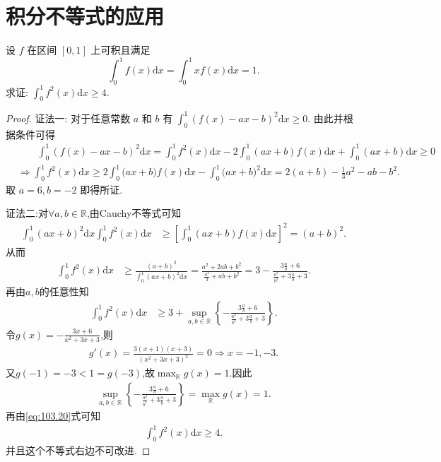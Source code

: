 \documentclass[../../main.tex]{subfiles}
\begin{document}
\section{积分不等式的应用}

\begin{example}
设 $f$ 在区间 $[0,1]$ 上可积且满足
$$\int_0^1 f(x)\mathrm{d}x=\int_0^1 xf(x)\mathrm{d}x=1.$$
求证: $\int_0^1 f^2(x)\mathrm{d}x\geqslant 4$.
\end{example}
\begin{proof}
{\color{blue}证法一:}
对于任意常数 $a$ 和 $b$ 有 $\int_0^1 (f(x)-ax-b)^2\mathrm{d}x\geqslant 0$. 由此并根据条件可得
$$
\begin{aligned}
&\quad \quad \int_0^1{\left( f\left( x \right) -ax-b \right) ^2\mathrm{d}x}=\int_0^1{f^2\left( x \right) \mathrm{d}x}-2\int_0^1{\left( ax+b \right) f\left( x \right) \mathrm{d}x}+\int_0^1{\left( ax+b \right) \mathrm{d}x}\geqslant 0
\\
&\Longrightarrow \int_0^1{f^2\left( x \right) \mathrm{d}x}\geqslant 2\int_0^1{(ax}+b)f\left( x \right) \mathrm{d}x-\int_0^1{(ax}+b)^2\mathrm{d}x=2(a+b)-\frac{1}{3}a^2-ab-b^2.
\end{aligned}
$$
取 $a=6,b=-2$ 即得所证.

{\color{blue}证法二:}对$\forall a,b\in \mathbb{R}$,由Cauchy不等式可知
\begin{align*}
\int_0^1 (ax+b)^2\mathrm{d}x\int_0^1 f^2(x)\mathrm{d}x&\geqslant  \left[ \int_0^1 (ax+b)f(x)\mathrm{d}x \right]^2=(a+b)^2.
\end{align*}
从而
\begin{align*}
\int_0^1 f^2(x)\mathrm{d}x&\geqslant  \frac{(a+b)^2}{\int_0^1 (ax+b)^2\mathrm{d}x}=\frac{a^2+2ab+b^2}{\frac{a^2}{3}+ab+b^2}=3-\frac{3\frac{a}{b}+6}{\frac{a^2}{b^2}+3\frac{a}{b}+3}.
\end{align*}
再由$a,b$的任意性知
\begin{align}
\int_0^1 f^2(x)\mathrm{d}x&\geqslant  3+\sup_{a,b\in \mathbb{R}}\left\{ -\frac{3\frac{a}{b}+6}{\frac{a^2}{b^2}+3\frac{a}{b}+3} \right\}.\label{eq:103.20}
\end{align}
令$g(x)=-\frac{3x+6}{x^2+3x+3}$,则
\begin{align*}
g'(x)=\frac{3(x+1)(x+3)}{(x^2+3x+3)^2}=0\Rightarrow x=-1,-3.
\end{align*}
又$g(-1)=-3<1=g(-3)$,故$\max_{\mathbb{R}}g(x)=1$.因此
\begin{align*}
\sup_{a,b\in \mathbb{R}}\left\{ -\frac{3\frac{a}{b}+6}{\frac{a^2}{b^2}+3\frac{a}{b}+3} \right\}=\max_{\mathbb{R}}g(x)=1.
\end{align*}
再由\eqref{eq:103.20}式可知
\begin{align*}
\int_0^1 f^2(x)\mathrm{d}x\geqslant  4.
\end{align*}
并且这个不等式右边不可改进.
\end{proof}
\end{document}
